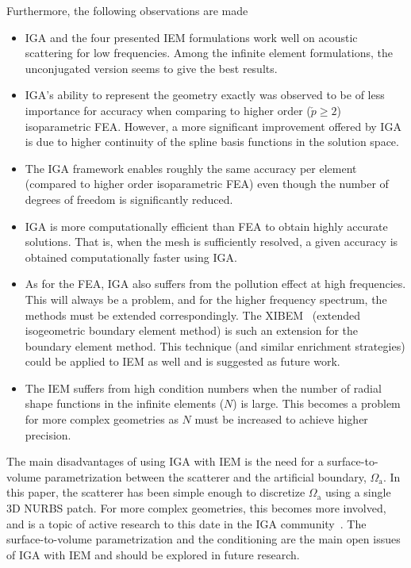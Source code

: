 Furthermore, the following observations are made
\begin{itemize}
	\item IGA and the four presented IEM formulations work well on acoustic scattering for low frequencies. Among the infinite element formulations, the unconjugated version seems to give the best results.
	\item IGA's ability to represent the geometry exactly was observed to be of less importance for accuracy when comparing to higher order ($\check{p}\geq 2$) isoparametric FEA. However, a more significant improvement offered by IGA is due to higher continuity of the spline basis functions in the solution space.
	\item The IGA framework enables roughly the same accuracy per element (compared to higher order isoparametric FEA) even though the number of degrees of freedom is significantly reduced.
	\item IGA is more computationally efficient than FEA to obtain highly accurate solutions. That is, when the mesh is sufficiently resolved, a given accuracy is obtained computationally faster using IGA.
	\item As for the FEA, IGA also suffers from the pollution effect at high frequencies. This will always be a problem, and for the higher frequency spectrum, the methods must be extended correspondingly. The XIBEM~\cite{Peake2013eib,Peake2015eib} (extended isogeometric boundary element method) is such an extension for the boundary element method. This technique (and similar enrichment strategies) could be applied to IEM as well and is suggested as future work.
	\item The IEM suffers from high condition numbers when the number of radial shape functions in the infinite elements ($N$) is large. This becomes a problem for more complex geometries as $N$ must be increased to achieve higher precision.
\end{itemize}
The main disadvantages of using IGA with IEM is the need for a surface-to-volume parametrization between the scatterer and the artificial boundary, $\Omega_{\mathrm{a}}$. In this paper, the scatterer has been simple enough to discretize $\Omega_{\mathrm{a}}$ using a single 3D NURBS patch. For more complex geometries, this becomes more involved, and is a topic of active research to this date in the IGA community~\cite{Engvall2016itb,Engvall2017iut,Xia2017iaw}. The surface-to-volume parametrization and the conditioning are the main open issues of IGA with IEM and should be explored in future research.


